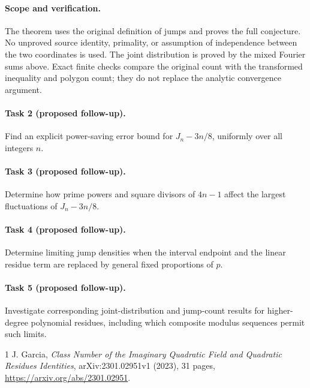 \documentclass[11pt]{article}
\begin{document}
\paragraph{Scope and verification.}
The theorem uses the original definition of jumps and proves the full
conjecture. No unproved source identity, primality, or assumption of
independence between the two coordinates is used. The joint distribution
is proved by the mixed Fourier sums above. Exact finite checks compare
the original count with the transformed inequality and polygon count;
they do not replace the analytic convergence argument.

\paragraph{Task 2 (proposed follow-up).}
Find an explicit power-saving error bound for \(J_n-3n/8\), uniformly
over all integers \(n\).

\paragraph{Task 3 (proposed follow-up).}
Determine how prime powers and square divisors of \(4n-1\) affect the
largest fluctuations of \(J_n-3n/8\).

\paragraph{Task 4 (proposed follow-up).}
Determine limiting jump densities when the interval endpoint and the
linear residue term are replaced by general fixed proportions of \(p\).

\paragraph{Task 5 (proposed follow-up).}
Investigate corresponding joint-distribution and jump-count results
for higher-degree polynomial residues, including which composite
modulus sequences permit such limits.

\begin{thebibliography}{1}
J. Garcia, \emph{Class Number of the Imaginary Quadratic Field and
Quadratic Residues Identities}, arXiv:2301.02951v1 (2023), 31 pages,
\url{https://arxiv.org/abs/2301.02951}.
\end{thebibliography}
\end{document}
